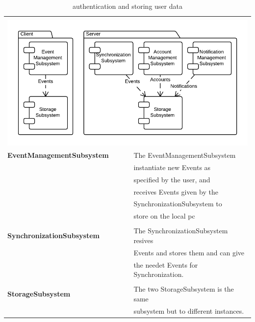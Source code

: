 \documentclass[a4paper]{article}
\begin{document}
\begin{table}
\centering

\begin{tabular}{l l}
	\hline\\
	\multicolumn{2}{l}{\includegraphics[scale = 0.3]{StoregetModel.png}}\\

	\textbf{EventManagementSubsystem}	&The EventManagementSubsystem\\
    									&instantiate new Events as\\
                                        &specified by the user, and\\
                                        &receives Events given by the\\
                                        &SynchronizationSubsystem to\\
                                        &store on the local pc\\
                                        &\\
	\textbf{SynchronizationSubsystem}	&The SynchronizationSubsystem resives\\
    									&Events and stores them and can give\\
                                        &the needet Events for Synchronization.\\
                                        &\\
	\textbf{StorageSubsystem}			&The two StorageSubsystem is the same\\
    									&subsystem but to different instances.\\
	\hline
\end{tabular}

\caption{authentication and storing user data}
\label{tab:stored}

\end{table}
\end{document}
